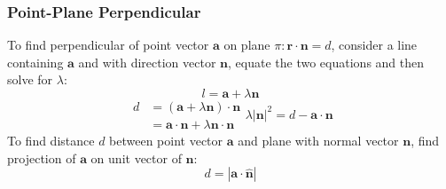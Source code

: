 \documentclass[../main]{subfiles}
\begin{document}
	\subsubsection{Point-Plane Perpendicular}
	To find perpendicular of point vector \(\mathbf{a}\) on plane \( \pi : \mathbf{r} \cdot \mathbf{n} = d \), consider a line containing \(\mathbf{a}\) and with direction vector \(\mathbf{n}\), equate the two equations and then solve for \(\lambda\):
	\[ l = \mathbf{a} + \lambda \mathbf{n} \]
	\begin{equation*}
		\begin{split}
		d & = (\mathbf{a} + \lambda \mathbf{n}) \cdot \mathbf{n} \\
		  & = \mathbf{a} \cdot \mathbf{n} + \lambda \mathbf{n} \cdot \mathbf{n}
		\end{split}
		\lambda | \mathbf{n} |^2 = d - \mathbf{a} \cdot \mathbf{n}
	\end{equation*}
	To find distance \(d\) between point vector \(\mathbf{a}\) and plane with normal vector \(\mathbf{n}\), find projection of \(\mathbf{a}\) on unit vector of \(\mathbf{n}\):
	\[ d = |\mathbf{a} \cdot \mathbf{\hat{n}}| \]
\end{document}
